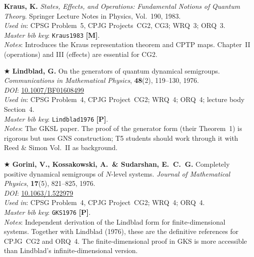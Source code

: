 \documentclass[11pt,a4paper]{article}
\begin{document}
\begin{enumerate}[leftmargin=2em, label={\textbf{[\arabic*]}}, itemsep=10pt, resume]
\item
  \textbf{Kraus, K.}
  \textit{States, Effects, and Operations: Fundamental Notions of Quantum Theory}.
  Springer Lecture Notes in Physics, Vol.~190, 1983.\\
  \textit{Used in}: CPSG Problem~5, CPJG Projects~CG2, CG3; WRQ~3; ORQ~3.\\
  \textit{Master bib key}: \texttt{Kraus1983} \textbf{[M]}.\\
  \textit{Notes}: Introduces the Kraus representation theorem and CPTP maps.
  Chapter~II (operations) and III (effects) are essential for CG2.

\item $\bigstar$
  \textbf{Lindblad, G.}
  On the generators of quantum dynamical semigroups.
  \textit{Communications in Mathematical Physics}, \textbf{48}(2), 119--130, 1976.\\
  \textit{DOI}: \href{https://doi.org/10.1007/BF01608499}{10.1007/BF01608499}\\
  \textit{Used in}: CPSG Problem~4, CPJG Project~CG2; WRQ~4; ORQ~4; lecture body Section~4.\\
  \textit{Master bib key}: \texttt{Lindblad1976} \textbf{[P]}.\\
  \textit{Notes}: The GKSL paper. The proof of the generator form (their Theorem~1)
  is rigorous but uses GNS construction; T5 students should work through it with
  Reed \& Simon Vol.~II as background.

\item $\bigstar$
  \textbf{Gorini, V., Kossakowski, A.\ \& Sudarshan, E.~C.~G.}
  Completely positive dynamical semigroups of $N$-level systems.
  \textit{Journal of Mathematical Physics}, \textbf{17}(5), 821--825, 1976.\\
  \textit{DOI}: \href{https://doi.org/10.1063/1.522979}{10.1063/1.522979}\\
  \textit{Used in}: CPSG Problem~4, CPJG Project~CG2; WRQ~4; ORQ~4.\\
  \textit{Master bib key}: \texttt{GKS1976} \textbf{[P]}.\\
  \textit{Notes}: Independent derivation of the Lindblad form for finite-dimensional
  systems. Together with Lindblad (1976), these are the definitive references for
  CPJG~CG2 and ORQ~4. The finite-dimensional proof in GKS is more accessible than
  Lindblad's infinite-dimensional version.

\end{enumerate}

\bigskip
\end{document}
